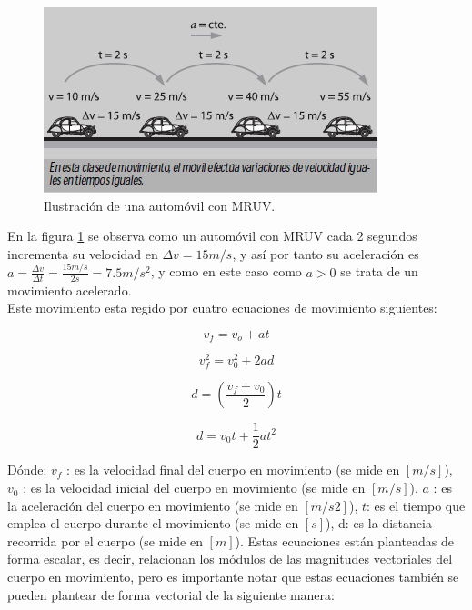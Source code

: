 \begin{figure}[ht]
 \centering
 \includegraphics[scale=0.7]{images/mruv.png}
 \caption{Ilustración de una automóvil con MRUV.}\label{mruv}
\end{figure} 

En la figura \ref{mruv} se observa como un automóvil con MRUV cada 2 segundos incrementa su velocidad en $\Delta v = 15 m/s$, y 
así por tanto su aceleración es $a = \frac{\Delta v}{\Delta t} = \frac{15 m/s}{2s} = 7.5 m/s^2$, y como en este caso como $a>0$ 
se trata de un movimiento acelerado.\\

Este movimiento esta regido por cuatro ecuaciones de movimiento siguientes:

\begin{equation}
 v_f = v_o + at
\end{equation}

\begin{equation}
 v_f^2 = v_0^2 + 2ad
\end{equation}

\begin{equation}
 d = (\frac{v_f+v_0}{2})t
\end{equation}

\begin{equation}
 d = v_0t+ \frac{1}{2}at^2
\end{equation}

Dónde: $v_f$ : es la velocidad final del cuerpo en movimiento (se mide en $[m/s]$), $v_0$ : es la velocidad inicial del cuerpo en 
movimiento (se mide en $[m/s]$), $a$ : es la aceleración del cuerpo en movimiento (se mide en $[m/s 2]$), $t$: es el tiempo que 
emplea el cuerpo durante el movimiento (se mide en $[s]$), d: es la distancia recorrida por el cuerpo (se mide en $[m]$). Estas 
ecuaciones están planteadas de forma escalar, es decir, relacionan los módulos de las magnitudes vectoriales del cuerpo en 
movimiento, pero es importante notar que estas ecuaciones también se pueden plantear de forma vectorial de la siguiente manera: 


